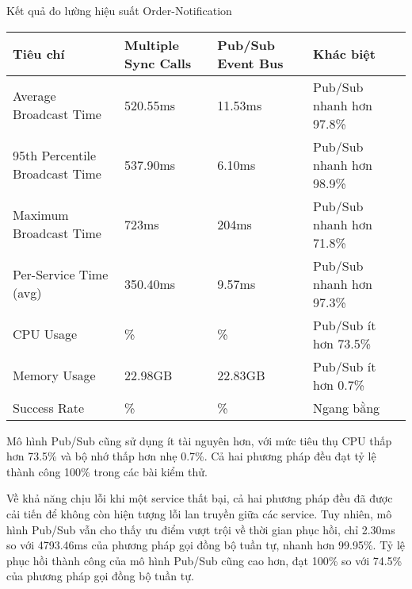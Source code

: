 \begin{table}[h]{Kết quả đo lường hiệu suất Order-Notification}
    \centering
    {\setlength{\arrayrulewidth}{1pt}
        \renewcommand{\arraystretch}{1.5}
        \setlength{\tabcolsep}{6pt}
        \begin{tabular}{|>{\raggedright\arraybackslash}p{3.2cm}|>{\raggedright\arraybackslash}p{3.2cm}|>{\raggedright\arraybackslash}p{3.2cm}|>{\raggedright\arraybackslash}p{3.2cm}|}
            \hline
            \textbf{Tiêu chí}              & \textbf{Multiple Sync Calls} & \textbf{Pub/Sub Event Bus} & \textbf{Khác biệt}       \\
            \hline
            Average Broadcast Time         & 520.55ms                     & 11.53ms                    & Pub/Sub nhanh hơn 97.8\% \\
            \hline
            95th Percentile Broadcast Time & 537.90ms                     & 6.10ms                     & Pub/Sub nhanh hơn 98.9\% \\
            \hline
            Maximum Broadcast Time         & 723ms                        & 204ms                      & Pub/Sub nhanh hơn 71.8\% \\
            \hline
            Per-Service Time (avg)         & 350.40ms                     & 9.57ms                     & Pub/Sub nhanh hơn 97.3\% \\
            \hline
            CPU Usage                      & 0.01173\%                    & 0.00311\%                  & Pub/Sub ít hơn 73.5\%    \\
            \hline
            Memory Usage                   & 22.98GB                      & 22.83GB                    & Pub/Sub ít hơn 0.7\%     \\
            \hline
            Success Rate                   & 100\%                        & 100\%                      & Ngang bằng               \\
            \hline
        \end{tabular}}
\end{table}

Mô hình Pub/Sub cũng sử dụng ít tài nguyên hơn, với mức tiêu thụ CPU thấp hơn 73.5\% và bộ nhớ thấp hơn nhẹ 0.7\%. Cả hai phương pháp đều đạt tỷ lệ thành công 100\% trong các bài kiểm thử.

Về khả năng chịu lỗi khi một service thất bại, cả hai phương pháp đều đã được cải tiến để không còn hiện tượng lỗi lan truyền giữa các service. Tuy nhiên, mô hình Pub/Sub vẫn cho thấy ưu điểm vượt trội về thời gian phục hồi, chỉ 2.30ms so với 4793.46ms của phương pháp gọi đồng bộ tuần tự, nhanh hơn 99.95\%. Tỷ lệ phục hồi thành công của mô hình Pub/Sub cũng cao hơn, đạt 100\% so với 74.5\% của phương pháp gọi đồng bộ tuần tự.


